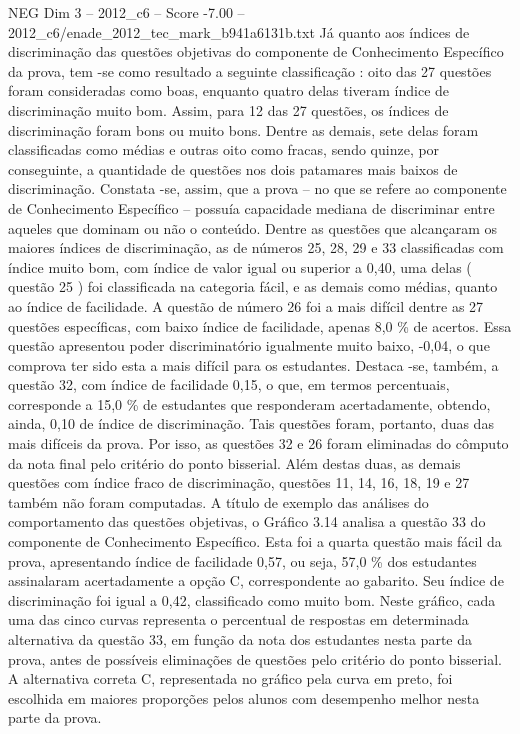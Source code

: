 \begin{textsample}{NEG Dim 3 – 2012\_c6 – Score -7.00 – 2012\_c6/enade\_2012\_tec\_mark\_b941a6131b.txt}
Já quanto aos índices de discriminação das questões objetivas do componente de Conhecimento Específico da prova, tem -se como resultado a seguinte classificação : oito das 27 questões foram consideradas como boas, enquanto quatro delas tiveram índice de discriminação muito bom.
Assim, para 12 das 27 questões, os índices de discriminação foram bons ou muito bons.
Dentre as demais, sete delas foram classificadas como médias e outras oito como fracas, sendo quinze, por conseguinte, a quantidade de questões nos dois patamares mais baixos de discriminação.
Constata -se, assim, que a prova – no que se refere ao componente de Conhecimento Específico – possuía capacidade mediana de discriminar entre aqueles que dominam ou não o conteúdo.
Dentre as questões que alcançaram os maiores índices de discriminação, as de números 25, 28, 29 e 33 classificadas com índice muito bom, com índice de valor igual ou superior a 0,40, uma delas ( questão 25 ) foi classificada na categoria fácil, e as demais como médias, quanto ao índice de facilidade.
A questão de número 26 foi a mais difícil dentre as 27 questões específicas, com baixo índice de facilidade, apenas 8,0 \% de acertos.
Essa questão apresentou poder discriminatório igualmente muito baixo, -0,04, o que comprova ter sido esta a mais difícil para os estudantes.
Destaca -se, também, a questão 32, com índice de facilidade 0,15, o que, em termos percentuais, corresponde a 15,0 \% de estudantes que responderam acertadamente, obtendo, ainda, 0,10 de índice de discriminação.
Tais questões foram, portanto, duas das mais difíceis da prova.
Por isso, as questões 32 e 26 foram eliminadas do cômputo da nota final pelo critério do ponto bisserial.
Além destas duas, as demais questões com índice fraco de discriminação, questões 11, 14, 16, 18, 19 e 27 também não foram computadas.
A título de exemplo das análises do comportamento das questões objetivas, o Gráfico 3.14 analisa a questão 33 do componente de Conhecimento Específico.
Esta foi a quarta questão mais fácil da prova, apresentando índice de facilidade 0,57, ou seja, 57,0 \% dos estudantes assinalaram acertadamente a opção C, correspondente ao gabarito.
Seu índice de discriminação foi igual a 0,42, classificado como muito bom.
Neste gráfico, cada uma das cinco curvas representa o percentual de respostas em determinada alternativa da questão 33, em função da nota dos estudantes nesta parte da prova, antes de possíveis eliminações de questões pelo critério do ponto bisserial.
A alternativa correta C, representada no gráfico pela curva em preto, foi escolhida em maiores proporções pelos alunos com desempenho melhor nesta parte da prova.

\end{textsample}
